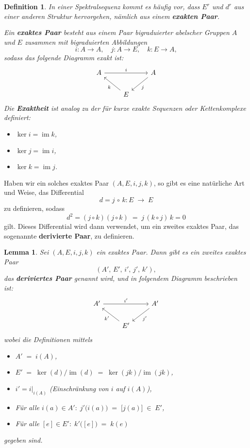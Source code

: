 \documentclass[12pt]{article}
\numberwithin{conj}{section}
\newtheorem{definition}[conj]{Definition}
\newtheorem{lemma}[conj]{Lemma}
\newcommand{\ima}{\operatorname{im}}
\begin{document}
\begin{definition}
    In einer Spektralsequenz kommt es häufig vor, dass $E^r$ und $d^r$ aus einer anderen Struktur hervorgehen, nämlich aus einem \textbf{exakten Paar}.
    
    Ein \textbf{exaktes Paar} besteht aus einem Paar bigraduierter abelscher Gruppen $A$ und $E$ zusammen mit bigraduierten Abbildungen
    \[
        i : A \to A,
        \quad
        j : A \to E,
        \quad
        k : E \to A,
    \]
    sodass das folgende Diagramm exakt ist:
    \[
        \begin{tikzcd}
            A && A \\
            & E
            \arrow["i", from=1-1, to=1-3]
            \arrow["j", from=1-3, to=2-2]
            \arrow["k", from=2-2, to=1-1]
        \end{tikzcd}
    \]
    Die \textbf{Exaktheit} ist analog zu der für kurze exakte Sequenzen oder Kettenkomplexe definiert:
    \begin{itemize}[nolistsep]
        \item $\ker i = \ima k$,
        \item $\ker j = \ima i$,
        \item $\ker k = \ima j$.
    \end{itemize}
\end{definition}

Haben wir ein solches exaktes Paar $(A,E,i,j,k)$, so gibt es eine natürliche Art und Weise, das Differential
\[
    d = j \,\circ\, k : E \;\longrightarrow\; E
\]
zu definieren, sodass
\[
    d^2 = (j \circ k)(j \circ k) \;=\; j\,(k \circ j)\,k = 0
\]
gilt. Dieses Differential wird dann verwendet, um ein zweites exaktes Paar, das sogenannte \textbf{derivierte Paar}, zu definieren.

\begin{lemma}
    Sei $(A,E,i,j,k)$ ein exaktes Paar. Dann gibt es ein zweites exaktes Paar
    \[
        (A',\,E',\,i',\,j',\,k'),
    \]
    das \textbf{deriviertes Paar} genannt wird, und in folgendem Diagramm beschrieben ist:
    \[
        \begin{tikzcd}
            A' && A' \\
            & E'
            \arrow["i'", from=1-1, to=1-3]
            \arrow["j'", from=1-3, to=2-2]
            \arrow["k'", from=2-2, to=1-1]
        \end{tikzcd}
    \]
    wobei die Definitionen mittels
    \begin{itemize}[nolistsep]
        \item $A' \;=\; i(A)$,
        \item $E' \;=\; \ker(d)\big/\ima(d) \;=\; \ker(jk)\big/\ima(jk)$,
        \item $i' = i\vert_{i(A)}$ (Einschränkung von $i$ auf $i(A)$),
        \item Für alle $i(a) \in A':\; j'\bigl(i(a)\bigr) \;=\; \bigl[j(a)\bigr] \;\in\; E'$,
        \item Für alle $[e] \in E':\; k'\bigl([e]\bigr) \;=\; k(e)$
    \end{itemize}
    gegeben sind.
\end{lemma}
\end{document}
